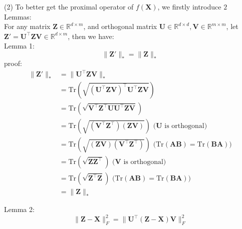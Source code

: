 (2) To better get the proximal operator of $f(\mathbf{X})$, we firstly introduce $2$ Lemmas:\\
For any matrix $\mathbf{Z}\in \mathbb{R}^{d\times m}$, and orthogonal matrix $\mathbf{U}\in \mathbb{R}^{d\times d},\mathbf{V}\in \mathbb{R}^{m\times m}$, let $\mathbf{Z}'=\mathbf{U}^{\top}\mathbf{Z}\mathbf{V}\in \mathbb{R}^{d\times m}$, then we have:\\

Lemma 1:\\
$$\|\mathbf{Z}'\|_* = \|\mathbf{Z}\|_*$$
proof:
\begin{align*}
    \|\mathbf{Z}'\|_* &= \|\mathbf{U}^{\top}\mathbf{Z}\mathbf{V}\|_* \\
    &= \text{Tr}\left(\sqrt{(\mathbf{U}^{\top}\mathbf{Z}\mathbf{V})^{\top}\mathbf{U}^{\top}\mathbf{Z}\mathbf{V}}\right) \\
    &= \text{Tr}\left(\sqrt{\mathbf{V}^{\top}\mathbf{Z}^{\top}\mathbf{U}\mathbf{U}^{\top}\mathbf{Z}\mathbf{V}}\right) \\
    &= \text{Tr}\left(\sqrt{(\mathbf{V}^{\top}\mathbf{Z}^{\top})(\mathbf{Z}\mathbf{V})}\right) \text{ \ \ \ \ \ ($\mathbf{U}$ is orthogonal)} \\
    &= \text{Tr}\left(\sqrt{(\mathbf{Z}\mathbf{V})(\mathbf{V}^{\top}\mathbf{Z}^{\top})}\right) \text{ \ \ \ \ \ ($\text{Tr}(\mathbf{AB})=\text{Tr}(\mathbf{BA})$)} \\
    &= \text{Tr}\left(\sqrt{\mathbf{Z}\mathbf{Z}^{\top}}\right) \text{ \ \ \ \ \ \ \ \ \ \ \ \ \ \ \ \ \ \ ($\mathbf{V}$ is orthogonal)} \\
    &= \text{Tr}\left(\sqrt{\mathbf{Z}^{\top}\mathbf{Z}}\right) \text{ \ \ \ \ \ \ \ \ \ \ \ \ \ \ \ \ \ \ ($\text{Tr}(\mathbf{AB})=\text{Tr}(\mathbf{BA})$)} \\
    &= \|\mathbf{Z}\|_*
\end{align*}

Lemma 2:\\
$$\|\mathbf{Z}-\mathbf{X}\|_F^2 = \|\mathbf{U}^{\top}(\mathbf{Z}-\mathbf{X})\mathbf{V}\|_F^2$$

